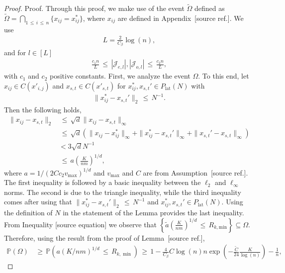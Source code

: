 \documentclass[twoside,11pt]{article}
\makeatletter
\newcommand{\discardlabel}[1]{}
\newcommand{\discardtwo}[2]{}
\newcommand{\legacyref}[1]{\textup{[source ref.]}}
\newcommand{\legacyeqref}[1]{\textup{[source equation]}}
\newenvironment{legacycomparison}{%
  \begingroup\color{legacygray}%
  \let\label\discardlabel
  \let\originallabel\discardlabel
  \let\ref\legacyref
  \let\pageref\legacyref
  \let\eqref\legacyeqref
  \let\cref\legacyref
  \let\Cref\legacyref
  \let\autoref\legacyref
  \let\aliasref\discardtwo
}{\endgroup}
\newcommand{\aliasref}[2]{%
  \@ifundefined{r@#2}{}{%
    \expandafter\let\csname r@#1\expandafter\endcsname\csname r@#2\endcsname}}
\makeatother
\begin{document}
\begin{legacycomparison}
\begin{proof}
Proof. Through this proof, we make use of the event $\tilde \Omega$ defined as $\tilde \Omega = \bigcap_{1 \,\leq\, i \,\leq\, n}\{x_{ij} = x_{ij}^*\}$, where $x_{ij}$ are defined in Appendix~\ref{beta_mix_intro}. We use
\begin{align}
    L = \frac{2}{C_{\beta}} \log(n), \label{eq:288}
\end{align}
and for $l \in [L]$
\begin{align}
    \frac{c_1n}{L} \,\leq\, |\mathcal{J}_{e,l}|, |\mathcal{J}_{o,l}| \,\leq\, \frac{c_2n}{L}, \label{eq:289}
\end{align}
with $c_1$ and $c_2$ positive constants.
First, we analyze the event $\Omega$. To this end, let $x_{ij} \in C(x'_{i,j})$ and $x_{s,t} \in C(x'_{s,t})$ for $x_{ij}^*,x_{s,t}' \in P_{\text{lat}}(N)$ with
\begin{align}
    \|x_{ij}^* - x_{s,t}'\|_2 \,\leq\, N^{-1}. \label{eq:290}
\end{align}
Then the following holds,
\begin{align}
    \|x_{ij} - x_{s,t}\|_2 &\,\leq\, \sqrt{d} \|x_{ij} - x_{s,t}\|_\infty \nonumber \\
    &\,\leq\, \sqrt{d} (\|x_{ij} - x_{ij}^*\|_\infty + \|x_{ij}^* - x_{s,t}'\|_\infty + \|x_{s,t}' - x_{s,t}\|_\infty) \nonumber \\
    &< 3\sqrt{d}N^{-1} \nonumber \\
    &\,\leq\, a \left( \frac{K}{nm} \right)^{1/d}, \nonumber
\end{align}
where $a = 1/(2Cc_2v_{\text{max}})^{1/d}$ and $v_{\text{max}}$ and $C$ are from Assumption~\ref{Assumption 1.}. The first inequality is followed by a basic inequality between the $\ell_2$ and $\ell_\infty$ norms. The second is due to the triangle inequality, while the third inequality comes after using that $\|x_{ij}^* - x_{s,t}'\|_2 \,\leq\, N^{-1}$ and $x_{ij}^*, x_{s,t}' \in P_{\text{lat}}(N)$. Using the definition of $N$ in the statement of the Lemma provides the last inequality. From Inequality \eqref{eq:290} we observe that $\left\{\tilde a \left(\frac{K}{nm}\right)^{1/d} \,\leq\, R_{k,\text{min}}\right\} \subseteq \Omega$. Therefore, using the result from the proof of Lemma~\ref{Lemma_13},
\begin{align}
    \mathbb{P}\left(\Omega\right) &\,\geq\, \mathbb{P}\left(a\left(K/nm\right)^{1/d}\,\leq\, R_{k,\min}\right) \,\geq\, 1 - \frac{4}{C_{\beta}} C\log(n)n\exp\left(-\frac{\tilde C}{24}\frac{K}{\log(n)}\right) - \frac{1}{n}, \label{eq:291__duplicate2}
\end{align}


\end{proof}
\end{legacycomparison}
\end{document}
